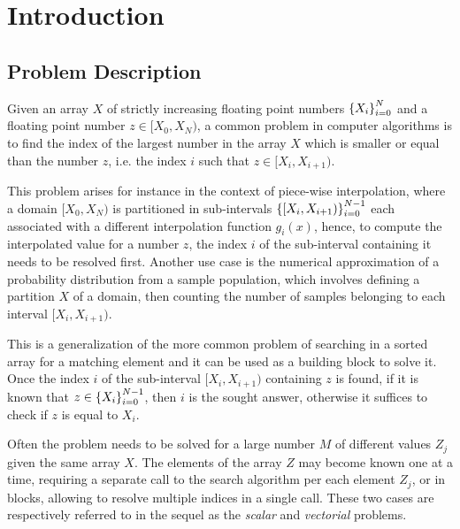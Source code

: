 \documentclass[preprint,1p,times]{elsarticle}
\begin{document}
\section{Introduction}
\label{sec:introduction}


\subsection{Problem Description}

Given an array $X$ of strictly increasing floating point numbers $\left \{ X_i \right \}_{i=0}^{N}$  
and a floating point number $z \in [X_0,X_N)$,
a common problem in computer algorithms is to find the index of the largest number in the array $X$ which is smaller or equal than the number $z$, i.e. the index $i$ such that $z \in [X_i,X_{i+1})$.

This problem arises for instance in the context of piece-wise interpolation, where a domain $[X_0,X_N)$ 
is partitioned in sub-intervals $\left \{ [X_{i},X_{i+1}) \right \}_{i=0}^{N-1}$ each associated with a different interpolation function $g_i(x)$, hence, to compute the interpolated value for a number
$z$, the index $i$ of the sub-interval containing it needs to be resolved first.
Another use case is the numerical approximation of a probability distribution from a sample population, which involves defining a partition $X$ of a domain, then counting the number of samples belonging to each interval $[X_i,X_{i+1})$.

This is a generalization of the more common problem of searching in a sorted array for a matching element and it can be used as a building block to solve it. Once the index $i$ of the sub-interval $[X_i,X_{i+1})$ containing $z$ is found, if it is known that $z \in \left \{ X_i \right \}_{i=0}^{N-1}$, then $i$ is the sought answer, otherwise it suffices to check if $z$ is equal to $X_i$. 

Often the problem needs to be solved for a large number $M$ of different values $Z_j$ given the same array $X$.
The elements of the array $Z$ may become known one at a time, requiring a separate call to the search algorithm per each element $Z_j$, or in blocks, allowing to resolve multiple indices in a single call. These two  cases are respectively referred to in the sequel as the \textit{scalar} and \textit{vectorial} problems.
\end{document}
